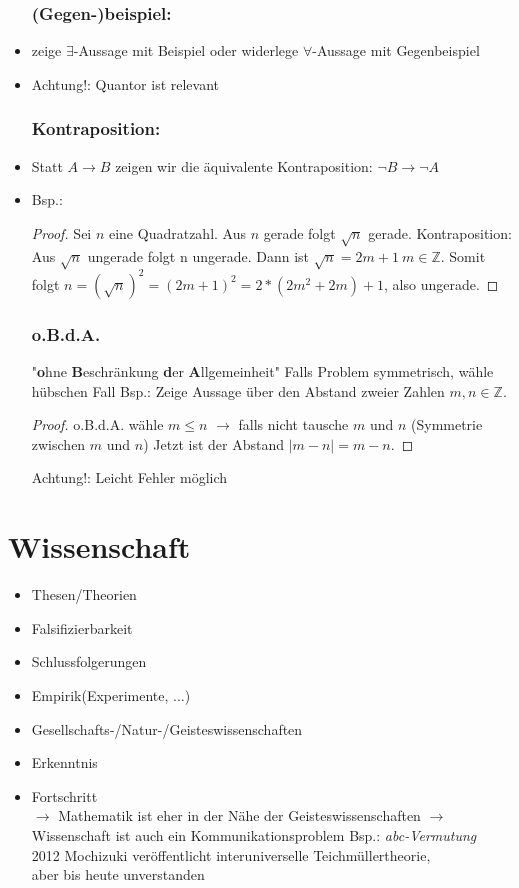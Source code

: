 \documentclass[12pt]{article}
\numberwithin{equation}{subsection}
\begin{document}
\begin{itemize}
		\subsubsection{(Gegen-)beispiel:}
		\item zeige $\exists$-Aussage mit Beispiel oder widerlege $\forall$-Aussage mit Gegenbeispiel\\
		\item Achtung!: Quantor ist relevant
		\subsubsection{Kontraposition:}
		\item Statt $A\to B$ zeigen wir die äquivalente Kontraposition: $\neg B\to\neg A$
		\item Bsp.:
		\begin{proof} Sei $n$ eine Quadratzahl. Aus $n$ gerade folgt $\sqrt{n}$ gerade.
		\subsubitem Kontraposition: Aus $\sqrt{n}$ ungerade folgt n ungerade. Dann ist $\sqrt{n}=2m+1\ m\in \mathbb{Z}$. 
		Somit folgt $n=(\sqrt{n})^2=(2m+1)^2=2*(2m^2+2m)+1$, also ungerade.
		\end{proof}
		\subsubsection{o.B.d.A.}
		\subitem "\textbf{o}hne \textbf{B}eschränkung \textbf{d}er \textbf{A}llgemeinheit"
		\subitem Falls Problem symmetrisch, wähle hübschen Fall
		\subitem Bsp.: Zeige Aussage über den Abstand zweier Zahlen $m,n\in \mathbb{Z}$.
		\begin{proof}
		\subsubitem o.B.d.A. wähle $m\leq n$
		\subsubitem $\to$ falls nicht tausche $m$ und $n$ (Symmetrie zwischen $m$ und $n$)
		\subsubitem Jetzt ist der Abstand $\left|m-n\right|=m-n$.
		\end{proof}
		\subitem Achtung!: Leicht Fehler möglich
	\end{itemize}
	\section{Wissenschaft}
	\begin{itemize}
		\item Thesen/Theorien
		\item Falsifizierbarkeit
		\item Schlussfolgerungen
		\item Empirik(Experimente, ...)
		\item Gesellschafts-/Natur-/Geisteswissenschaften
		\item Erkenntnis
		\item Fortschritt\\
		\subitem $\to$ Mathematik ist eher in der Nähe der Geisteswissenschaften
		\subitem $\to$ Wissenschaft ist auch ein Kommunikationsproblem
		\subitem Bsp.: \textit{abc-Vermutung}\\
		2012 Mochizuki veröffentlicht interuniverselle Teichmüllertheorie,\\ aber bis heute unverstanden
	\end{itemize}
\end{document}
